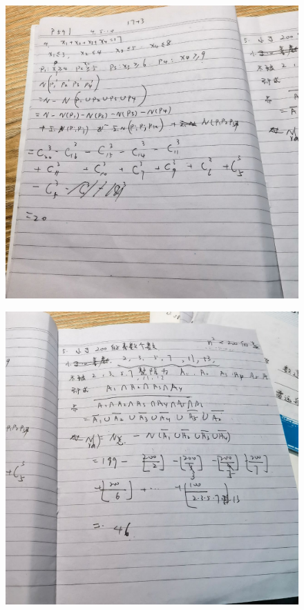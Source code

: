 \documentclass{article}
\begin{document}
    \begin{figure}[H]
    \centering
    \includegraphics[width=1\textwidth]{IMG_20221205_183656.jpg}
    \caption{\label{Lab9}}
    \end{figure}

    \begin{figure}[H]
    \centering
    \includegraphics[width=1\textwidth]{IMG_20221205_183658.jpg}
    \caption{\label{Lab9}}
    \end{figure}
    
\end{document}
